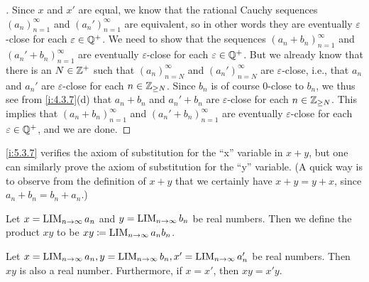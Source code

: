 \begin{proof}[]
  Since \(x\) and \(x'\) are equal, we know that the rational Cauchy sequences \((a_n)_{n = 1}^{\infty}\) and \((a_n')_{n = 1}^{\infty}\) are equivalent, so in other words they are eventually \(\varepsilon\)-close for each \(\varepsilon \in \mathbb{Q}^+\).
  We need to show that the sequences \((a_n + b_n)_{n = 1}^{\infty}\) and \((a_n' + b_n)_{n = 1}^{\infty}\) are eventually \(\varepsilon\)-close for each \(\varepsilon \in \mathbb{Q}^+\).
  But we already know that there is an \(N \in \mathbb{Z}^+\) such that \((a_n)_{n = N}^{\infty}\) and \((a_n')_{n = N}^{\infty}\) are \(\varepsilon\)-close, i.e., that \(a_n\) and \(a_n'\) are \(\varepsilon\)-close for each \(n \in \mathbb{Z}_{\geq N}\).
  Since \(b_n\) is of course \(0\)-close to \(b_n\), we thus see from \cref{i:4.3.7}(d) that \(a_n + b_n\) and \(a_n' + b_n\) are \(\varepsilon\)-close for each \(n \in \mathbb{Z}_{\geq N}\).
  This implies that \((a_n + b_n)_{n = 1}^{\infty}\) and \((a_n' + b_n)_{n = 1}^{\infty}\) are eventually \(\varepsilon\)-close for each \(\varepsilon \in \mathbb{Q}^+\), and we are done.
\end{proof}

\begin{rmk}\label{i:5.3.8}
  \cref{i:5.3.7} verifies the axiom of substitution for the ``x'' variable in \(x + y\), but one can similarly prove the axiom of substitution for the ``y'' variable.
  (A quick way is to observe from the definition of \(x + y\) that we certainly have \(x + y = y + x\), since \(a_n + b_n = b_n + a_n\).)
\end{rmk}

\begin{defn}\label{i:5.3.9}
  Let \(x = \operatorname*{LIM}_{n \to \infty} a_n\) and \(y = \operatorname*{LIM}_{n \to \infty} b_n\) be real numbers.
  Then we define the product \(xy\) to be \(xy \coloneqq \operatorname*{LIM}_{n \to \infty} a_n b_n\).
\end{defn}

\begin{prop}\label{i:5.3.10}
  Let \(x = \operatorname*{LIM}_{n \to \infty} a_n, y = \operatorname*{LIM}_{n \to \infty} b_n, x' = \operatorname*{LIM}_{n \to \infty} a_n'\) be real numbers.
  Then \(xy\) is also a real number.
  Furthermore, if \(x = x'\), then \(xy = x'y\).
\end{prop}

